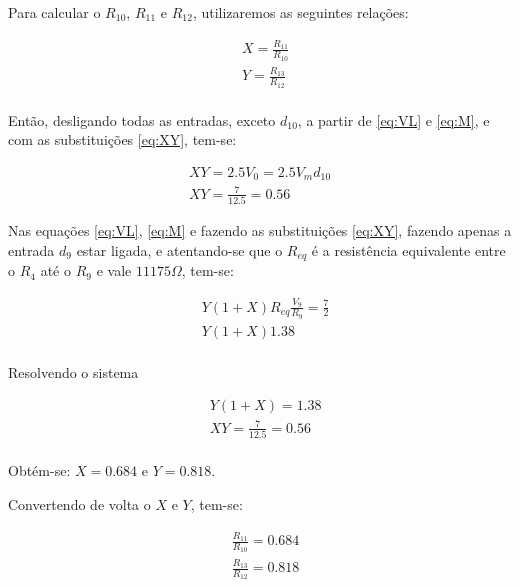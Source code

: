 Para calcular o $R_{10}$, $R_{11}$ e $R_{12}$, utilizaremos as seguintes relações:

\begin{equation}
    \label{eq:XY}
    \begin{aligned}
         & X = \frac{R_{11}}{R_{10}} \\
         & Y = \frac{R_{13}}{R_{12}} \\
    \end{aligned}
\end{equation}

Então, desligando todas as entradas, exceto $d_{10}$, a partir de \ref{eq:VL} e \ref{eq:M}, e com as substituições \ref{eq:XY}, tem-se:

\begin{equation}
    \begin{aligned}
        X Y = 2.5 V_0 = 2.5 V_m d_{10} \\
        X Y = \frac{7}{12.5} = 0.56
    \end{aligned}
\end{equation}

Nas equações \ref{eq:VL}, \ref{eq:M} e fazendo as substituições \ref{eq:XY}, fazendo apenas a entrada $d_{9}$ estar ligada, e atentando-se que o $R_{eq}$ é a resistência equivalente entre o $R_4$ até o $R_9$ e vale $11175\Omega$, tem-se:

\begin{equation}
    \begin{aligned}
         & Y ( 1 + X ) R_{eq} \frac{V_9}{R_9} = \frac{7}{2} \\
         & Y ( 1 + X )  1.38                                \\
    \end{aligned}
\end{equation}

Resolvendo o sistema

\begin{equation}
    \begin{aligned}
         & Y ( 1 + X ) = 1.38          \\
         & X Y = \frac{7}{12.5} = 0.56 \\
    \end{aligned}
\end{equation}

Obtém-se: $X = 0.684$ e $Y = 0.818$.

Convertendo de volta o $X$ e $Y$, tem-se:

\begin{equation}
    \begin{aligned}
         & \frac{R_{11}}{R_{10}} = 0.684 \\
         & \frac{R_{13}}{R_{12}} = 0.818 \\
    \end{aligned}
\end{equation}

